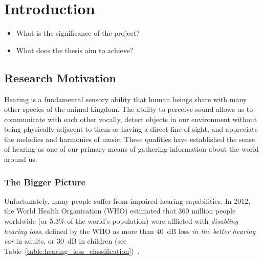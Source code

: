 
\setcounter{page}{1}

	\pagestyle{fancy}
	\lhead{{\sffamily \MakeUppercase\leftmark}}
	\chead{}
	\rhead{{\sffamily \MakeUppercase\rightmark}}
	\lfoot{}
	\cfoot{{\sffamily \thepage}}
	\rfoot{}
	
\chapter{Introduction}

\begin{center}
	\begin{tcolorbox}[title=\boxtitle]
		\begin{itemize}[leftmargin=*,labelindent=2ex,labelsep=1.5ex,itemsep=0pt,parsep=0pt]
    		\item What is the significance of the project?
			\item What does the thesis aim to achieve?
		\end{itemize}
	\end{tcolorbox}
\end{center}


\section{Research Motivation}

Hearing is a fundamental sensory ability that human beings share with many other
species of the animal kingdom. The ability to perceive sound allows us to
communicate with each other vocally, detect objects in our environment without
being physically adjacent to them or having a direct line of sight, and
appreciate the melodies and harmonies of music. These qualities have established
the sense of hearing as one of our primary means of gathering information about
the world around us.

\subsection{The Bigger Picture}

Unfortunately, many people suffer from impaired hearing capabilities. In 2012,
the World Health Organisation (WHO) estimated that 360 million people worldwide
(or 5.3\% of the world's population) were afflicted with \emph{disabling hearing
loss}, defined by the WHO as more than 40~dB loss \emph{in the better hearing
ear} in adults, or 30~dB in children (see
Table~\ref{table:hearing_loss_classification})~\cite{who2012}.

